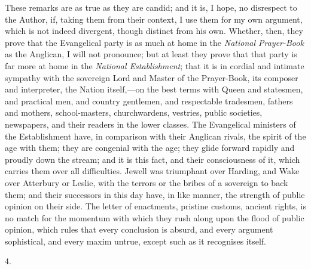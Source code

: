 These remarks are as true as they are candid; and it is, I hope, no
disrespect to the Author, if, taking them from their context, I use
them for my own argument, which is not indeed divergent, though
distinct from his own. Whether, then, they prove that the Evangelical
party is as much at home in the \emph{National Prayer-Book} as the
Anglican, I will not pronounce; but at least they prove that that
party is far more at home in the \emph{National Establishment}; that
it is in cordial and intimate sympathy with the sovereign Lord and
Master of the Prayer-Book, its composer and interpreter, the Nation
itself,—on the best terms with Queen and statesmen, and practical
men, and country gentlemen, and respectable tradesmen, fathers and
mothers, school-masters, churchwardens, vestries, public societies,
newspapers, and their readers in the lower classes. The Evangelical
ministers of the Establishment have, in comparison with their Anglican
rivals, the spirit of the age with them; they are congenial with the
age; they glide forward rapidly and proudly down the stream; and it is
this fact, and their consciousness of it, which carries them over all
difficulties. Jewell was triumphant over Harding, and Wake over
Atterbury or Leslie, with the terrors or the bribes of a sovereign to
back them; and their successors in this day have, in like manner, the
strength of public opinion on their side. The letter of enactments,
pristine customs, ancient rights, is no match for the momentum with
which they rush along upon the flood of public opinion, which rules
that every conclusion is absurd, and every argument sophistical, and
every maxim untrue, except such as it recognises itself.

4.

